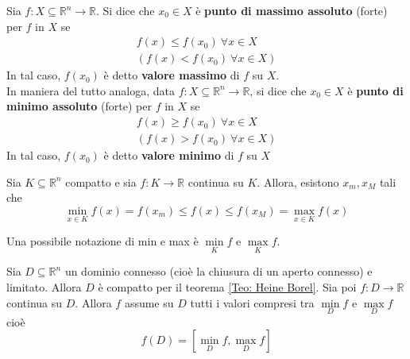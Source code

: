 \begin{definition}
Sia $f:X \subseteq \mathbb{R}^n \to \mathbb{R}$. Si dice che $x_0 \in X$ è \textbf{punto di massimo assoluto} (forte) per $f$ in $X$ se
\begin{equation}
    \begin{aligned}
        f(x) \leq f(x_0) \ \forall x  \in X \\
        (f(x) < f(x_0) \ \forall x  \in X)
    \end{aligned}
\end{equation}
In tal caso, $f(x_0)$ è detto \textbf{valore massimo} di $f$ su $X$.\\
In maniera del tutto analoga, data $f:X \subseteq \mathbb{R}^n \to \mathbb{R}$, si dice che $x_0 \in X$ è \textbf{punto di minimo assoluto} (forte) per $f$ in $X$ se
\begin{equation}
    \begin{aligned}
        f(x) \geq f(x_0) \ \forall x \in X\\
        (f(x)>f(x_0) \ \forall x \in X)
    \end{aligned}
\end{equation}
In tal caso, $f(x_0)$ è detto \textbf{valore minimo} di $f$ su $X$
\end{definition}
\begin{theorem}[Weierstrass] \label{Teo: Weierstrass}
    Sia $K \subseteq \mathbb{R}^n$ compatto e sia $f: K \to \mathbb{R}$ continua su $K$. Allora, esistono $x_m, x_M$ tali che
    \begin{equation}
    \min_{x \in K}{f(x)}= f(x_m) \leq f(x) \leq f(x_M) = \max_{x \in K}{f(x)}    
    \end{equation}
\end{theorem}
    \begin{oss}
        Una possibile notazione di min e max è $ \min\limits_{K}{f}$ e $\max\limits_{K}{f}$.
    \end{oss}
\begin{theorem} \label{Teo: Valori intermedi}
    Sia $D \subseteq \mathbb{R}^n$ un dominio connesso (cioè la chiusura di un aperto connesso) e limitato. Allora $D$ è compatto per il teorema \ref{Teo: Heine Borel}.
    Sia poi $f:D \to \mathbb{R}$ continua su $D$. Allora $f$ assume su $D$ tutti i valori compresi tra $\min\limits_{D}{f}$ e $\max\limits_{D}{f}$ cioè
    \begin{equation}
        f(D)=\left[ \min_{D}{f}, \max_{D}{f}\right]
    \end{equation}
\end{theorem}
